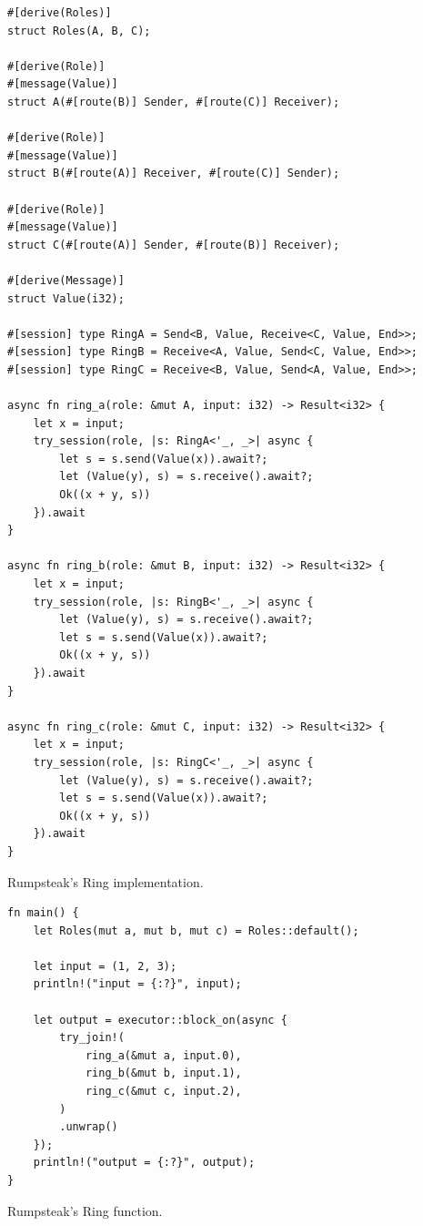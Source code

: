 \begin{listing}
    \centering
    \begin{verbatim}
#[derive(Roles)]
struct Roles(A, B, C);

#[derive(Role)]
#[message(Value)]
struct A(#[route(B)] Sender, #[route(C)] Receiver);

#[derive(Role)]
#[message(Value)]
struct B(#[route(A)] Receiver, #[route(C)] Sender);

#[derive(Role)]
#[message(Value)]
struct C(#[route(A)] Sender, #[route(B)] Receiver);

#[derive(Message)]
struct Value(i32);

#[session] type RingA = Send<B, Value, Receive<C, Value, End>>;
#[session] type RingB = Receive<A, Value, Send<C, Value, End>>;
#[session] type RingC = Receive<B, Value, Send<A, Value, End>>;

async fn ring_a(role: &mut A, input: i32) -> Result<i32> {
    let x = input;
    try_session(role, |s: RingA<'_, _>| async {
        let s = s.send(Value(x)).await?;
        let (Value(y), s) = s.receive().await?;
        Ok((x + y, s))
    }).await
}

async fn ring_b(role: &mut B, input: i32) -> Result<i32> {
    let x = input;
    try_session(role, |s: RingB<'_, _>| async {
        let (Value(y), s) = s.receive().await?;
        let s = s.send(Value(x)).await?;
        Ok((x + y, s))
    }).await
}

async fn ring_c(role: &mut C, input: i32) -> Result<i32> {
    let x = input;
    try_session(role, |s: RingC<'_, _>| async {
        let (Value(y), s) = s.receive().await?;
        let s = s.send(Value(x)).await?;
        Ok((x + y, s))
    }).await
}
    \end{verbatim}
    \caption{Rumpsteak's Ring implementation.}
    \label{lst:rumpsteak-ring}
\end{listing}

\begin{listing}
    \begin{verbatim}
fn main() {
    let Roles(mut a, mut b, mut c) = Roles::default();

    let input = (1, 2, 3);
    println!("input = {:?}", input);

    let output = executor::block_on(async {
        try_join!(
            ring_a(&mut a, input.0),
            ring_b(&mut b, input.1),
            ring_c(&mut c, input.2),
        )
        .unwrap()
    });
    println!("output = {:?}", output);
}
    \end{verbatim}
    \caption{Rumpsteak's Ring  function.}
    \label{lst:rumpsteak-ring-main}
\end{listing}

